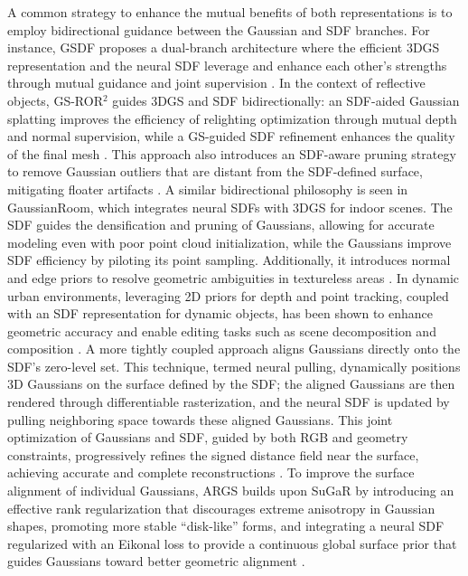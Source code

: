 \documentclass[11pt]{article}
\begin{document}
A common strategy to enhance the mutual benefits of both representations is to employ bidirectional guidance between the Gaussian and SDF branches. For instance, GSDF proposes a dual-branch architecture where the efficient 3DGS representation and the neural SDF leverage and enhance each other's strengths through mutual guidance and joint supervision \cite{ref198}. In the context of reflective objects, GS-ROR\(^2\) guides 3DGS and SDF bidirectionally: an SDF-aided Gaussian splatting improves the efficiency of relighting optimization through mutual depth and normal supervision, while a GS-guided SDF refinement enhances the quality of the final mesh \cite{ref199}. This approach also introduces an SDF-aware pruning strategy to remove Gaussian outliers that are distant from the SDF-defined surface, mitigating floater artifacts \cite{ref199}. A similar bidirectional philosophy is seen in GaussianRoom, which integrates neural SDFs with 3DGS for indoor scenes. The SDF guides the densification and pruning of Gaussians, allowing for accurate modeling even with poor point cloud initialization, while the Gaussians improve SDF efficiency by piloting its point sampling. Additionally, it introduces normal and edge priors to resolve geometric ambiguities in textureless areas \cite{ref200}. In dynamic urban environments, leveraging 2D priors for depth and point tracking, coupled with an SDF representation for dynamic objects, has been shown to enhance geometric accuracy and enable editing tasks such as scene decomposition and composition \cite{ref201}. A more tightly coupled approach aligns Gaussians directly onto the SDF's zero-level set. This technique, termed neural pulling, dynamically positions 3D Gaussians on the surface defined by the SDF; the aligned Gaussians are then rendered through differentiable rasterization, and the neural SDF is updated by pulling neighboring space towards these aligned Gaussians. This joint optimization of Gaussians and SDF, guided by both RGB and geometry constraints, progressively refines the signed distance field near the surface, achieving accurate and complete reconstructions \cite{ref202}. To improve the surface alignment of individual Gaussians, ARGS builds upon SuGaR by introducing an effective rank regularization that discourages extreme anisotropy in Gaussian shapes, promoting more stable ``disk-like'' forms, and integrating a neural SDF regularized with an Eikonal loss to provide a continuous global surface prior that guides Gaussians toward better geometric alignment \cite{ref187}.
\end{document}
